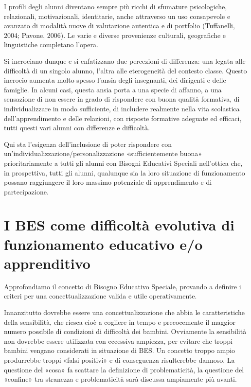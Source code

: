 I profili degli alunni diventano sempre più ricchi di sfumature psicologiche, relazionali,
motivazionali, identitarie, anche attraverso un uso consapevole e avanzato di modalità nuove di
valutazione autentica e di portfolio (Tuffanelli, 2004; Pavone, 2006). Le varie e diverse provenienze
culturali, geografiche e linguistiche completano l'opera.

Si incrociano dunque e si enfatizzano due percezioni di differenza: una legata alle difficoltà di
un singolo alunno, l'altra alle eterogeneità del contesto classe. Questo incrocio aumenta molto
spesso l'ansia degli insegnanti, dei dirigenti e delle famiglie. In alcuni casi, questa ansia porta a una
specie di affanno, a una sensazione di non essere in grado di rispondere con buona qualità
formativa, di individualizzare in modo sufficiente, di includere realmente nella vita scolastica
dell'apprendimento e delle relazioni, con risposte formative adeguate ed efficaci, tutti questi vari
alunni con differenze e difficoltà.

Qui sta l'esigenza dell'inclusione di poter rispondere con
un'individualizzazione/personalizzazione «sufficientemente buona» prioritariamente a tutti gli
alunni con Bisogni Educativi Speciali nell'ottica che, in prospettiva, tutti gli alunni, qualunque sia la
loro situazione di funzionamento possano raggiungere il loro massimo potenziale di
apprendimento e di partecipazione.
\section*{I BES come difficoltà evolutiva di funzionamento educativo e/o apprenditivo}
Approfondiamo il concetto di Bisogno Educativo Speciale, provando a definire i criteri per una
concettualizzazione valida e utile operativamente.

Innanzitutto dovrebbe essere una concettualizzazione che abbia le caratteristiche della
sensibilità, che riesca cioè a cogliere in tempo e precocemente il maggior numero possibile di
condizioni di difficoltà dei bambini. Ovviamente la sensibilità non dovrebbe essere utilizzata con
eccessiva ampiezza, per evitare che troppi bambini vengano considerati in situazione di BES. Un
concetto troppo ampio produrrebbe troppi «falsi positivi» e di conseguenza risulterebbe dannoso.
La questione del «cosa» fa scattare la definizione di problematicità, la questione del «confine» tra
stranezza e problematicità sarà discussa ampiamente più avanti.


